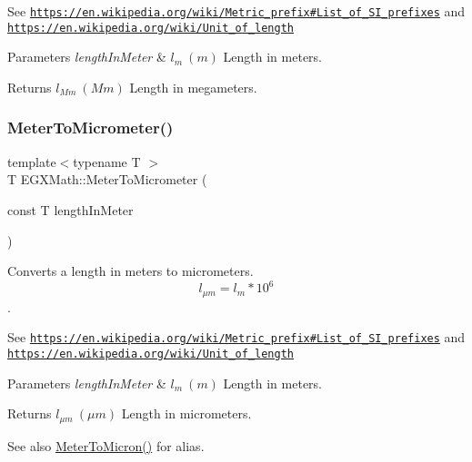 See \href{https://en.wikipedia.org/wiki/Metric_prefix#List_of_SI_prefixes}{\tt https\+://en.\+wikipedia.\+org/wiki/\+Metric\+\_\+prefix\#\+List\+\_\+of\+\_\+\+S\+I\+\_\+prefixes} and \href{https://en.wikipedia.org/wiki/Unit_of_length}{\tt https\+://en.\+wikipedia.\+org/wiki/\+Unit\+\_\+of\+\_\+length} 
\begin{DoxyParams}{Parameters}
{\em length\+In\+Meter} & $ l_{m}\ (m)$ Length in meters. \\
\hline
\end{DoxyParams}
\begin{DoxyReturn}{Returns}
$ l_{Mm}\ (Mm)$ Length in megameters. 
\end{DoxyReturn}
\mbox{\label{group___e_g_x_math-_conversions-_length_conversions-_meter-_s_i_gac0114c26af780ce603948df83f5e338e}} 
\subsubsection{\texorpdfstring{Meter\+To\+Micrometer()}{MeterToMicrometer()}}
{\footnotesize\ttfamily template$<$typename T $>$ \\
T E\+G\+X\+Math\+::\+Meter\+To\+Micrometer (\begin{DoxyParamCaption}\item[{const T}]{length\+In\+Meter }\end{DoxyParamCaption})}



Converts a length in meters to micrometers. \[ l_{\mu m}=l_{m} * 10^{6} \]. 

See \href{https://en.wikipedia.org/wiki/Metric_prefix#List_of_SI_prefixes}{\tt https\+://en.\+wikipedia.\+org/wiki/\+Metric\+\_\+prefix\#\+List\+\_\+of\+\_\+\+S\+I\+\_\+prefixes} and \href{https://en.wikipedia.org/wiki/Unit_of_length}{\tt https\+://en.\+wikipedia.\+org/wiki/\+Unit\+\_\+of\+\_\+length} 
\begin{DoxyParams}{Parameters}
{\em length\+In\+Meter} & $ l_{m}\ (m)$ Length in meters. \\
\hline
\end{DoxyParams}
\begin{DoxyReturn}{Returns}
$ l_{\mu m}\ (\mu m)$ Length in micrometers. 
\end{DoxyReturn}
\begin{DoxySeeAlso}{See also}
\mbox{\hyperlink{group___e_g_x_math-_conversions-_length_conversions-_meter-_non-_s_i_ga9655833d43ede59b17c54a6f06f9681a}{Meter\+To\+Micron()}} for alias. 
\end{DoxySeeAlso}
\mbox{\label{group___e_g_x_math-_conversions-_length_conversions-_meter-_s_i_ga9bd519d9f6b1a52f85e7817f4f81690b}} 
